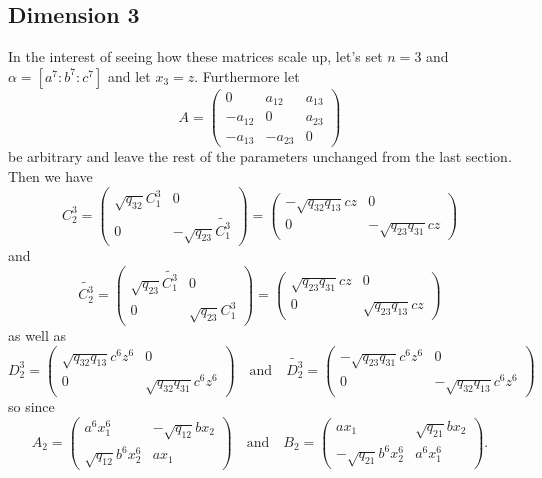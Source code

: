 \documentclass [11pt, proquest] {uwthesis}[2020/02/24]
\begin{document}
\subsection{Dimension 3}
    In the interest of seeing how these matrices scale up, let's set $n=3$ and $\alpha=[a^7:b^7:c^7]$ and let $x_3=z$. Furthermore let
    \[A=\left(\begin{smallmatrix}
        0& a_{12}& a_{13}\\-a_{12}&0&a_{23}\\-a_{13}&-a_{23}&0
    \end{smallmatrix}\right)\]
    be arbitrary and leave the rest of the parameters unchanged from the last section. Then we have 
    \[C_2^3=\begin{pmatrix}
        \sqrt{q_{32}}C_1^3 & 0 \\ 0&-\sqrt{q_{23}}\widetilde{C_1^3}
    \end{pmatrix}=\begin{pmatrix}
        -\sqrt{q_{32}q_{13}}cz & 0\\0& -\sqrt{q_{23}q_{31}}cz
    \end{pmatrix}\]
    and
    \[\widetilde{C_2^3}=\begin{pmatrix}
        \sqrt{q_{23}}\widetilde{C_1^3} & 0 \\ 0&\sqrt{q_{23}}C_1^3
    \end{pmatrix}=\begin{pmatrix}
        \sqrt{q_{23}q_{31}}cz & 0\\0&\sqrt{q_{23}q_{13}}cz
    \end{pmatrix}\]
    as well as 
    \[D_2^3=\begin{pmatrix}
        \sqrt{q_{32}q_{13}}c^6z^6 & 0\\0& \sqrt{q_{32}q_{31}}c^6z^6
    \end{pmatrix}\quad\text{and}\quad\widetilde{D_2^3}=\begin{pmatrix}
        -\sqrt{q_{23}q_{31}}c^6z^6&0\\0&-\sqrt{q_{32}q_{13}}c^6z^6
    \end{pmatrix}\]
    so since 
    \[A_2=\begin{pmatrix}
        a^6x_1^6 & -\sqrt{q_{12}}bx_2\\ 
        \sqrt{q_{12}}b^6x_2^6 & ax_1
    \end{pmatrix}\quad\text{and}\quad 
    B_2=\begin{pmatrix}
        ax_1 & \sqrt{q_{21}}bx_2\\ 
        -\sqrt{q_{21}}b^6x_2^6 & a^6x_1^6
    \end{pmatrix}.\]
\end{document}
